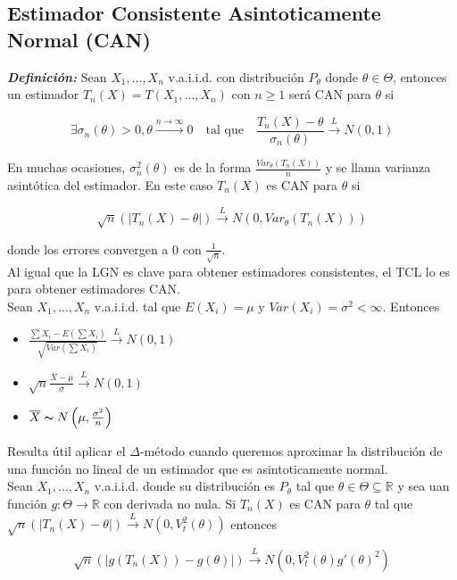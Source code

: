 \subsection{Estimador Consistente Asintoticamente Normal (CAN)}

\textbf{\textit{Definición: }} Sean $X_1,\dots,X_n$ v.a.i.i.d. con distribución $P_\theta$ donde $\theta \in \Theta$, entonces un estimador $T_n(X)=T(X_1,\dots,X_n)$ con $n\geq 1$ será CAN para $\theta$ si

\[
    \exists \sigma_n(\theta) > 0, \theta \xrightarrow{n\to\infty}0 \quad \text{tal que}\quad \frac{T_n(X)-\theta}{\sigma_n(\theta)}\overset{L}{\to}N(0,1)
\]

En muchas ocasiones, $\sigma^2_n(\theta)$ es de la forma $\frac{Var_\theta(T_n(X))}{n}$ y se llama varianza asintótica del estimador. En este caso $T_n(X)$ es CAN para $\theta$ si

\[
    \sqrt{n}(|T_n(X)-\theta|) \overset{L}{\to} N(0, Var_\theta(T_n(X)))
\]

donde los errores convergen a 0 con $\frac{1}{\sqrt{n}}$. \\

Al igual que la LGN es clave para obtener estimadores consistentes, el TCL lo es para obtener estimadores CAN. \\
Sean $X_1,\dots,X_n$ v.a.i.i.d. tal que $E(X_i)=\mu$ y $Var(X_i)=\sigma^2 < \infty$. Entonces

\begin{itemize}
    \item $\frac{\sum{X_i} - E(\sum{X_i})}{\sqrt{Var(\sum{X_i})}} \overset{L}{\to} N(0,1)$
    \item $\sqrt{n}\frac{\overline{X}-\mu}{\sigma}\overset{L}{\to}N(0,1)$
    \item $\overline{X}\thicksim N\left(\mu,\frac{\sigma^2}{n}\right)$
\end{itemize}

Resulta útil aplicar el $\Delta$-método cuando queremos aproximar la distribución de una función no lineal de un estimador que es asintoticamente normal.\\
Sean $X_1,\dots,X_n$ v.a.i.i.d. donde su distribución es $P_\theta$ tal que $\theta \in \Theta \subseteq \mathbb{R}$ y sea uan función $g:\Theta \to \mathbb{R}$ con derivada no nula. Si $T_n(X)$ es CAN para $\theta$ tal que $\sqrt{n}(|T_n(X)-\theta|)\overset{L}{\to}N(0,V^2_t(\theta))$ entonces

\[
    \sqrt{n}(|g(T_n(X))-g(\theta)|)\overset{L}{\to}N(0,V^2_t(\theta)g'(\theta)^2)
\]

